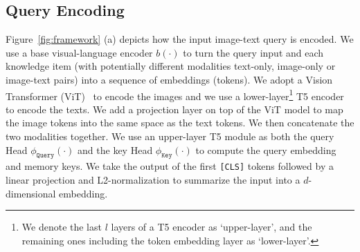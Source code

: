 \documentclass[10pt,twocolumn,letterpaper]{article}
\begin{document}
   
    









\subsection{Query Encoding} \label{sec:encoding}
Figure~\ref{fig:framework} (a) depicts how the input image-text query is encoded.
We use a base visual-language encoder $b(\cdot)$ to turn the query input and each knowledge item (with potentially different modalities \eg text-only, image-only or image-text pairs) into a sequence of embeddings (tokens).
We adopt a Vision Transformer (ViT)~\cite{ViT} to encode the images and we use a lower-layer\footnote{We denote the last $l$ layers of a T5 encoder as `upper-layer', and the remaining ones including the token embedding layer as `lower-layer'.} T5 encoder~\cite{DBLP:journals/jmlr/RaffelSRLNMZLL20} to encode the texts. We add a projection layer on top of the ViT model to map the image tokens into the same space as the text tokens. We then concatenate the two modalities together.
We use an upper-layer T5 module as both the query Head $\phi_{\texttt{Query}}(\cdot)$ and the key Head $\phi_{\texttt{Key}}(\cdot)$ to compute the query embedding and memory keys. We take the output of the first \texttt{[CLS]} tokens followed by a linear projection and 
L2-normalization to summarize the input into a $d$-dimensional embedding.
\end{document}
